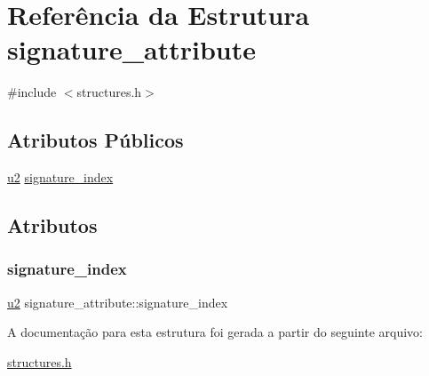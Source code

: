 \hypertarget{structsignature__attribute}{}\section{Referência da Estrutura signature\+\_\+attribute}
\label{structsignature__attribute}


{\ttfamily \#include $<$structures.\+h$>$}

\subsection*{Atributos Públicos}
\begin{DoxyCompactItemize}
\item 
\hyperlink{lista__operandos_8h_a732cde1300aafb73b0ea6c2558a7a54f}{u2} \hyperlink{structsignature__attribute_a63a67e73289180add457fbc0ae36413f}{signature\+\_\+index}
\end{DoxyCompactItemize}


\subsection{Atributos}
\mbox{\label{structsignature__attribute_a63a67e73289180add457fbc0ae36413f}} 
\subsubsection{\texorpdfstring{signature\+\_\+index}{signature\_index}}
{\footnotesize\ttfamily \hyperlink{lista__operandos_8h_a732cde1300aafb73b0ea6c2558a7a54f}{u2} signature\+\_\+attribute\+::signature\+\_\+index}



A documentação para esta estrutura foi gerada a partir do seguinte arquivo\+:\begin{DoxyCompactItemize}
\item 
\hyperlink{structures_8h}{structures.\+h}\end{DoxyCompactItemize}

